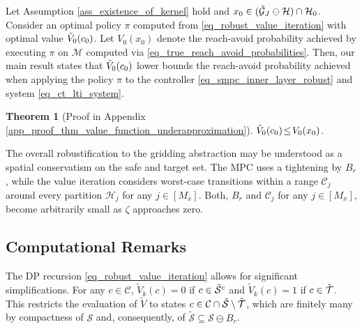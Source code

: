 \documentclass{IEEEtran}
\newtheorem{theorem}{Theorem}[section]
\begin{document}
Let Assumption \ref{ass_existence_of_kernel} hold and ${x}_0\in(\Tilde{\mathcal{G}}_J\ominus\mathcal{H})\cap\mathcal{H}_0$. Consider an optimal policy $\pi$ computed from \eqref{eq_robust_value_iteration} with optimal value $\Tilde{V}_0({c}_0)$. Let $V_0({x}_0)$ denote the reach-avoid probability achieved by executing $\pi$ on $\mathcal{M}$ computed via \eqref{eq_true_reach_avoid_probabilities}. Then, our main result states that $\Tilde{V}_0({c}_0)$ lower bounds the reach-avoid probability achieved when applying the policy $\pi$ to the controller \eqref{eq_smpc_inner_layer_robust} and system \eqref{eq_ct_lti_system}.
\begin{theorem}[Proof in Appendix \ref{app_proof_thm_value_function_underapproximation}]
    \label{thm_value_function_underapproximation}
    $\Tilde{V}_0({c}_0)\!\leq\!V_0({x}_0)$.
\end{theorem}

The overall robustification to the gridding abstraction may be understood as a spatial conservatism on the safe and target set. The MPC uses a tightening by $B_r$, while the value iteration considers worst-case transitions within a range $\mathcal{C}_j$ around every partition $\mathcal{H}_j$ for any $j\in [M_x]$. Both, $B_r$ and $\mathcal{C}_j$ for any $j\in[M_x]$, become arbitrarily small as $\zeta$ approaches zero.


\subsection{Computational Remarks}
\label{sec_computational_remarks}
The DP recursion \eqref{eq_robust_value_iteration} allows for significant simplifications. For any $c\in\mathcal{C}$, $\tilde{V}_k(c)=0$ if $c\in\Tilde{\mathcal{S}}^c$ and $\tilde{V}_k(c)=1$ if $c\in\Tilde{\mathcal{T}}$. This restricts the evaluation of $\tilde{V}$ to states $c\in\mathcal{C}\cap\Tilde{\mathcal{S}}\setminus\tilde{\mathcal{T}}$, which are finitely many by compactness of ${\mathcal{S}}$ and, consequently, of $\tilde{\mathcal{S}}\subseteq\mathcal{S}\ominus B_r$. 
\end{document}
